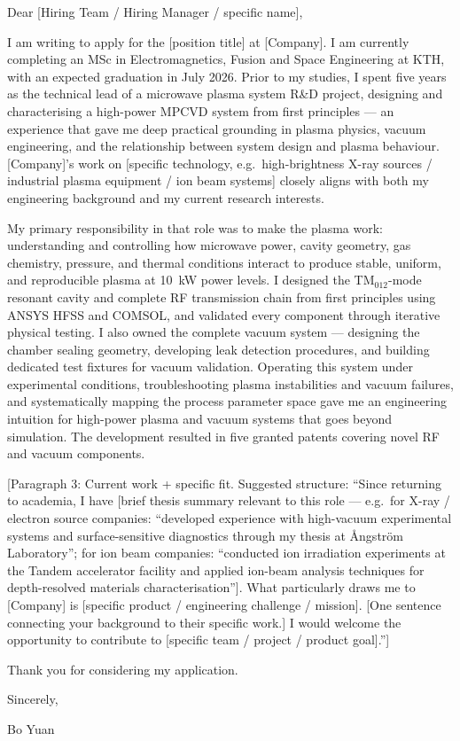 \documentclass[a4paper,11pt]{article}
\begin{document}
\noindent
Dear [Hiring Team / Hiring Manager / specific name],

\vspace{0.4cm}

I am writing to apply for the [position title] at [Company].
I am currently completing an MSc in Electromagnetics, Fusion and Space Engineering
at KTH, with an expected graduation in July 2026. Prior to my studies, I spent
five years as the technical lead of a microwave plasma system R\&D project,
designing and characterising a high-power MPCVD system from first principles ---
an experience that gave me deep practical grounding in plasma physics, vacuum
engineering, and the relationship between system design and plasma behaviour.
[Company]'s work on [specific technology, e.g.\ high-brightness X-ray sources /
industrial plasma equipment / ion beam systems] closely aligns with both my
engineering background and my current research interests.

\vspace{0.3cm}

My primary responsibility in that role was to make the plasma work: understanding
and controlling how microwave power, cavity geometry, gas chemistry, pressure,
and thermal conditions interact to produce stable, uniform, and reproducible
plasma at 10~kW power levels. I designed the TM$_{012}$-mode resonant cavity and
complete RF transmission chain from first principles using ANSYS HFSS and COMSOL,
and validated every component through iterative physical testing. I also owned
the complete vacuum system --- designing the chamber sealing geometry, developing
leak detection procedures, and building dedicated test fixtures for vacuum
validation. Operating this system under experimental conditions, troubleshooting
plasma instabilities and vacuum failures, and systematically mapping the process
parameter space gave me an engineering intuition for high-power plasma and vacuum
systems that goes beyond simulation. The development resulted in five granted
patents covering novel RF and vacuum components.

\vspace{0.3cm}

[Paragraph 3: Current work + specific fit. Suggested structure: ``Since returning
to academia, I have [brief thesis summary relevant to this role --- e.g.\ for
X-ray / electron source companies: ``developed experience with high-vacuum
experimental systems and surface-sensitive diagnostics through my thesis at
Ångström Laboratory''; for ion beam companies: ``conducted ion irradiation
experiments at the Tandem accelerator facility and applied ion-beam analysis
techniques for depth-resolved materials characterisation'']. What particularly
draws me to [Company] is [specific product / engineering challenge / mission].
[One sentence connecting your background to their specific work.] I would welcome
the opportunity to contribute to [specific team / project / product goal].'']

\vspace{0.3cm}

Thank you for considering my application.

\vspace{0.6cm}

\noindent
Sincerely, \\

\vspace{0.3cm}

\noindent
Bo Yuan
\end{document}
